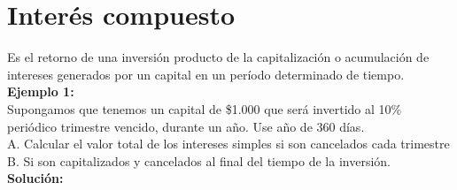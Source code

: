 \section{Interés compuesto}
Es el retorno de una inversión producto de la capitalización o acumulación de intereses generados por un capital en un período determinado de tiempo.\\

\textbf{Ejemplo 1:}\\
Supongamos que tenemos un capital de \$1.000 que será invertido al 10\% periódico trimestre vencido, durante un año. Use año de 360 días.\\

A. Calcular el valor total de los intereses simples si son cancelados cada trimestre\\
B. Si son capitalizados y cancelados al final del tiempo de la inversión.\\

\textbf{Solución:}\\

